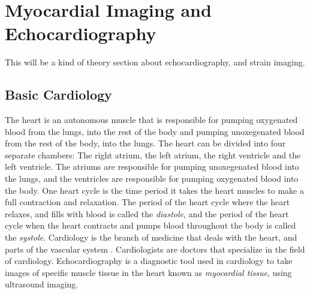 \chapter{Myocardial Imaging and Echocardiography} \label{chap:strain}
\begin{comment}
[ ] Short about cardiology and echocardiography history
[ ] Short about the heart, and its anatomy
[ ] Even shorter about ultrasound, the different views, and what parts of the heart can be seen in them.
[ ] Method for extracting strain curves from ultrasound videos.
[ ] Explain the different diagnosises that will be encountered in this thesis.
[ ] Explain anatomical reasoning for why symptoms for certain diagnosis are evident in strain curves.
[ ] Summarize chapter
\end{comment}

This will be a kind of theory section about echocardiography, and strain imaging. \bigskip

\section{Basic Cardiology}
\begin{comment}
[ ] Short about cardiology and echocardiography history
[ ] Short about the heart, and its anatomy
\end{comment}
The heart is an autonomous muscle that is responsible for pumping oxygenated blood from the lungs, into the rest of the body and pumping unoxegenated blood from the rest of the body, into the lungs. The heart can be divided into four separate chambers: The right atrium, the left atrium, the right ventricle and the left ventricle. The atriums are responsible for pumping unoxegenated blood into the lungs, and the ventricles are responsible for pumping oxygenated blood into the body. One heart cycle is the time period it takes the heart muscles to make a full contraction and relaxation. The period of the heart cycle where the heart relaxes, and fills with blood is called the \textit{diastole}, and the period of the heart cycle when the heart contracts and pumps blood throughout the body is called the \textit{systole}. Cardiology is the branch of medicine that deals with the heart, and parts of the vascular system \cite{cardiology_wikipedia}. Cardiologists are doctors that specialize in the field of cardiology. Echocardiography is a diagnostic tool used in cardiology to take images of specific muscle tissue in the heart known as \textit{myocardial tissue}, using ultrasound imaging. 

